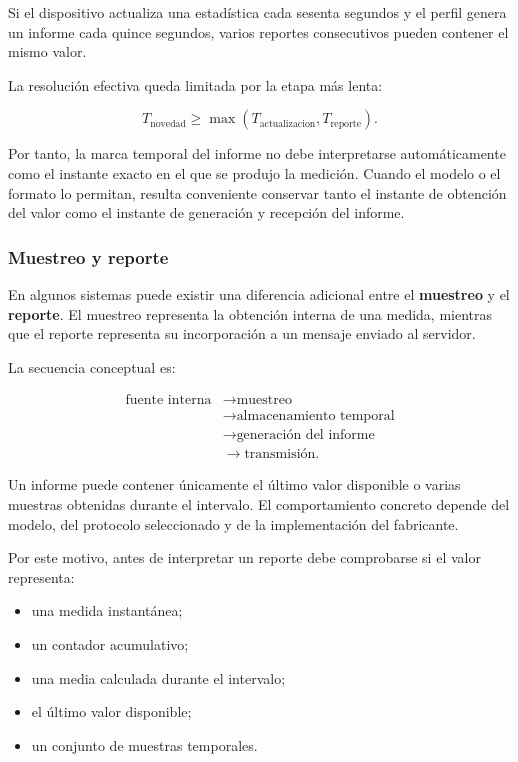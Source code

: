 Si el dispositivo actualiza una estadística cada sesenta segundos y el
perfil genera un informe cada quince segundos, varios reportes
consecutivos pueden contener el mismo valor.

La resolución efectiva queda limitada por la etapa más lenta:

\[
    T_{\mathrm{novedad}}
    \geq
    \max
    \left(
        T_{\mathrm{actualizacion}},
        T_{\mathrm{reporte}}
    \right).
\]

Por tanto, la marca temporal del informe no debe interpretarse
automáticamente como el instante exacto en el que se produjo la medición.
Cuando el modelo o el formato lo permitan, resulta conveniente conservar
tanto el instante de obtención del valor como el instante de generación y
recepción del informe.


\subsubsection*{Muestreo y reporte}

En algunos sistemas puede existir una diferencia adicional entre el
\textbf{muestreo} y el \textbf{reporte}. El muestreo representa la
obtención interna de una medida, mientras que el reporte representa su
incorporación a un mensaje enviado al servidor.

La secuencia conceptual es:

\[
\begin{aligned}
    \text{fuente interna}
    &\longrightarrow
    \text{muestreo}\\
    &\longrightarrow
    \text{almacenamiento temporal}\\
    &\longrightarrow
    \text{generación del informe}\\
    &\longrightarrow
    \text{transmisión}.
\end{aligned}
\]

Un informe puede contener únicamente el último valor disponible o varias
muestras obtenidas durante el intervalo. El comportamiento concreto
depende del modelo, del protocolo seleccionado y de la implementación del
fabricante.

Por este motivo, antes de interpretar un reporte debe comprobarse si el
valor representa:

\begin{itemize}
    \item una medida instantánea;
    \item un contador acumulativo;
    \item una media calculada durante el intervalo;
    \item el último valor disponible;
    \item un conjunto de muestras temporales.
\end{itemize}


